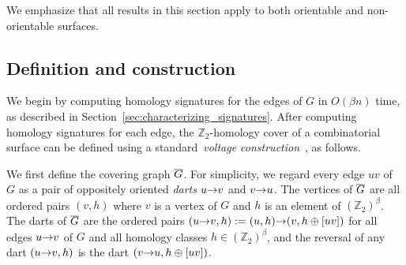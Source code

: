 \documentclass[letterpaper,review]{siamart190516}
\def\arcto{\mathord\shortrightarrow}
\def\arc#1#2{#1\arcto#2}
\def\Z{\mathbb{Z}}
\def\Gbar{\overline{\smash{G}\vphantom{t}}}
\begin{document}
We emphasize that all results in this section apply to both orientable and non-orientable surfaces.

%
%
%
%
%
%
%
%

\subsection{Definition and construction}
\label{sec:homcover_cover}

We begin by computing homology signatures for the edges of $G$ in $O(\beta n)$ time, as described in Section~\ref{sec:characterizing_signatures}.
After computing homology signatures for each edge, the $\Z_2$-homology cover of a combinatorial surface can be defined using a standard~\emph{voltage construction}~\cite[Chapter 4]{gt-tgt-01}, as follows.

We first define the covering graph $\Gbar$.  For simplicity, we regard every edge $uv$ of $G$ as a pair of oppositely oriented \emph{darts} $\arc{u}{v}$ and $\arc{v}{u}$.  The vertices of $\Gbar$ are all ordered pairs $(v, h)$ where $v$ is a vertex of $G$ and $h$ is an element of $(\Z_2)^\beta$.  The darts of $\Gbar$ are the ordered pairs $(\arc{u}{v}, h) := (u, h)\arcto(v, h\oplus [uv])$ for all edges $\arc{u}{v}$ of $G$ and all homology classes $h \in (\Z_2)^\beta$, and the reversal of any dart $(\arc{u}{v}, h)$ is the dart $(\arc{v}{u}, h\oplus[uv])$.
\end{document}
